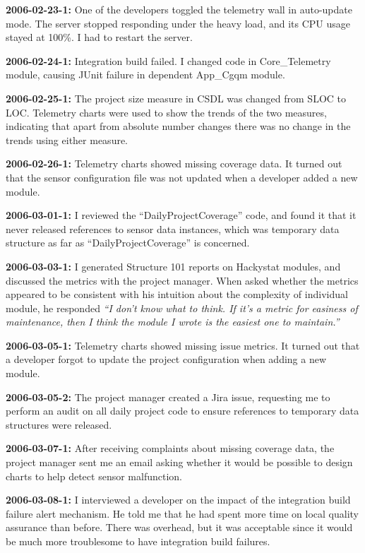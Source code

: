 \textbf{2006-02-23-1:}
One of the developers toggled the telemetry wall in auto-update mode. The server stopped responding under the heavy load, and its CPU usage stayed at 100\%. I had to restart the server.

\textbf{2006-02-24-1:}
Integration build failed. I changed code in Core\_Telemetry module, causing JUnit failure in dependent App\_Cgqm module. 

\textbf{2006-02-25-1:}
The project size measure in CSDL was changed from SLOC to LOC. Telemetry charts were used to show the trends of the two measures, indicating that apart from absolute number changes there was no change in the trends using either measure.

\textbf{2006-02-26-1:}
Telemetry charts showed missing coverage data. It turned out that the sensor configuration file was not updated when a developer added a new module.

\textbf{2006-03-01-1:}
I reviewed the ``DailyProjectCoverage'' code, and found it that it never released references to sensor data instances, which was temporary data structure as far as ``DailyProjectCoverage'' is concerned. 

\textbf{2006-03-03-1:}
I generated Structure 101 reports on Hackystat modules, and discussed the metrics with the project manager. When asked whether the metrics appeared to be consistent with his intuition about the complexity of individual module, he responded \textit{``I don't know what to think. If it's a metric for easiness of maintenance, then I think the module I wrote is the easiest one to maintain.''}

\textbf{2006-03-05-1:}
Telemetry charts showed missing issue metrics. It turned out that a developer forgot to update the project configuration when adding a new module.

\textbf{2006-03-05-2:}
The project manager created a Jira issue, requesting me to perform an audit on all daily project code to ensure references to temporary data structures were released.

\textbf{2006-03-07-1:}
After receiving complaints about missing coverage data, the project manager sent me an email asking whether it would be possible to design charts to help detect sensor malfunction.

\textbf{2006-03-08-1:}
I interviewed a developer on the impact of the integration build failure alert mechanism. He told me that he had spent more time on local quality assurance than before. There was overhead, but it was acceptable since it would be much more troublesome to have integration build failures. 

